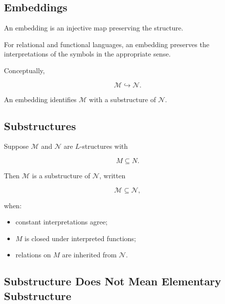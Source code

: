 \subsection{Embeddings}
\label{subsec:model-theoretic-embeddings}

An embedding is an injective map preserving the structure.

For relational and functional languages, an embedding preserves the
interpretations of the symbols in the appropriate sense.

Conceptually,

\[
\boxed{
\mathcal{M}
\hookrightarrow
\mathcal{N}.
}
\]

An embedding identifies \(\mathcal{M}\) with a substructure of
\(\mathcal{N}\).

\subsection{Substructures}
\label{subsec:model-theoretic-substructures}

Suppose \(\mathcal{M}\) and \(\mathcal{N}\) are \(L\)-structures with

\[
M\subseteq N.
\]

Then \(\mathcal{M}\) is a substructure of \(\mathcal{N}\), written

\[
\boxed{
\mathcal{M}
\subseteq
\mathcal{N},
}
\]

when:

\begin{itemize}
    \item constant interpretations agree;
    \item \(M\) is closed under interpreted functions;
    \item relations on \(M\) are inherited from \(\mathcal{N}\).
\end{itemize}

\subsection{Substructure Does Not Mean Elementary Substructure}
\label{subsec:substructure-not-elementary}

